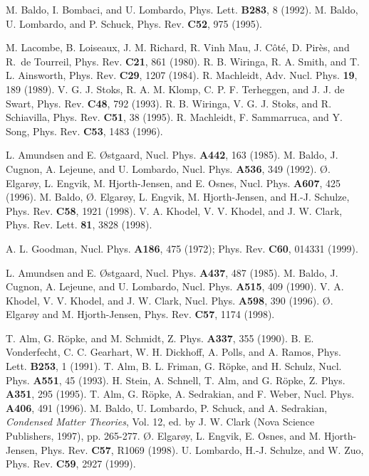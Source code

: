 \documentclass[runningheads]{svmult}
\begin{document}
\begin{thebibliography}{}
 M. Baldo, I. Bombaci, and U. Lombardo, 
 Phys. Lett. {\bf B283}, 8 (1992).
 M. Baldo, U. Lombardo, and P. Schuck,
 Phys. Rev. {\bf C52}, 975 (1995).

 M. Lacombe, B. Loiseaux, J. M. Richard, R. Vinh Mau, J. C\^ot\'e, 
 D. Pir\`es, and R.~de Tourreil,
 Phys. Rev. {\bf C21}, 861 (1980).
  R. B. Wiringa, R. A. Smith, and T. L. Ainsworth, 
  Phys. Rev. {\bf C29}, 1207 (1984).
  R. Machleidt, Adv. Nucl. Phys. {\bf 19}, 189 (1989).
  V. G. J. Stoks, R. A. M. Klomp, C. P. F. Terheggen, and J. J. de Swart,
  Phys. Rev. {\bf C48}, 792 (1993).
  R. B. Wiringa, V. G. J. Stoks, and R. Schiavilla, 
  Phys. Rev. {\bf C51}, 38 (1995).
  R. Machleidt, F. Sammarruca, and Y. Song, 
  Phys. Rev. {\bf C53}, 1483 (1996).

 L. Amundsen and E. \O stgaard, 
 Nucl. Phys. {\bf A442}, 163 (1985).
 M. Baldo, J. Cugnon, A. Lejeune, and U. Lombardo,
 Nucl. Phys. {\bf A536}, 349 (1992).
 \O. Elgar\o y, L. Engvik, M. Hjorth-Jensen, and E. Osnes, 
 Nucl. Phys. {\bf A607}, 425 (1996).
 M. Baldo, \O. Elgar\o y, L. Engvik, M. Hjorth-Jensen, and H.-J. Schulze,
 Phys. Rev. {\bf C58}, 1921 (1998).
 V. A. Khodel, V. V. Khodel, and J. W. Clark,
 Phys. Rev. Lett. {\bf 81}, 3828 (1998). 

 A. L. Goodman, 
 Nucl. Phys. {\bf A186}, 475 (1972); 
 Phys. Rev. {\bf C60}, 014331 (1999).

 L. Amundsen and E. \O stgaard, 
 Nucl. Phys. {\bf A437}, 487 (1985).
 M. Baldo, J. Cugnon, A. Lejeune, and U. Lombardo,
 Nucl. Phys. {\bf A515}, 409 (1990).
 V. A. Khodel, V. V. Khodel, and J. W. Clark,
 Nucl. Phys. {\bf A598}, 390 (1996). 
 \O. Elgar\o y and M. Hjorth-Jensen,
 Phys. Rev. {\bf C57}, 1174 (1998). 

 T. Alm, G. R\"opke, and M. Schmidt, 
 Z. Phys. {\bf A337}, 355 (1990).
 B. E. Vonderfecht, C. C. Gearhart, W. H. Dickhoff, A. Polls, and A. Ramos, 
 Phys. Lett. {\bf B253}, 1 (1991).
 T. Alm, B. L. Friman, G. R\"opke, and H. Schulz,  
 Nucl. Phys. {\bf A551}, 45 (1993).
 H. Stein, A. Schnell, T. Alm, and G. R\"opke,
 Z. Phys. {\bf A351}, 295 (1995). 
 T. Alm, G. R\"opke, A. Sedrakian, and F. Weber,
 Nucl. Phys. {\bf A406}, 491 (1996).
 M. Baldo, U. Lombardo, P. Schuck, and A. Sedrakian,
 {\it Condensed Matter Theories}, Vol. 12, ed. by J. W. Clark
 (Nova Science Publishers, 1997), pp. 265-277.
 \O. Elgar\o y, L. Engvik, E. Osnes, and M. Hjorth-Jensen,
 Phys. Rev. {\bf C57}, R1069 (1998).
 U. Lombardo, H.-J. Schulze, and W. Zuo, 
 Phys. Rev. {\bf C59}, 2927 (1999).


\end{thebibliography}
\end{document}
